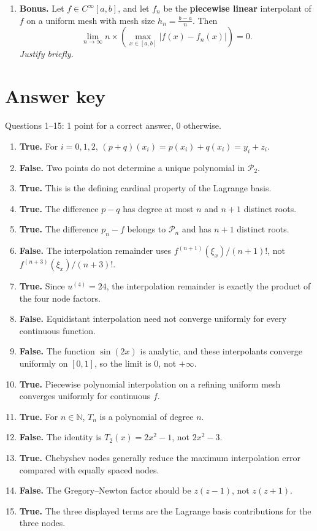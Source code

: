 \documentclass[a4paper]{article}
\begin{document}
\begin{enumerate}
    \item \textbf{Bonus.}
        Let $f\in C^{\infty}[a,b]$, and let $f_n$ be the \textbf{piecewise linear} interpolant of $f$ on a
        uniform mesh with mesh size $h_n= \frac{b-a}{n}$. 
        Then
        \[
            \lim_{n \to \infty} n \times \left( \max_{x\in[a,b]}\bigl\lvert f(x)-f_n(x)\bigr\rvert \right)=0.
        \]
        \emph{Justify briefly.}

\end{enumerate}

\ifdefined\showsolutions
\newpage
{}
\section*{Answer key}
\noindent Questions 1--15: 1 point for a correct answer, 0 otherwise.

\begin{enumerate}[itemsep=8pt]
    \item \textbf{True.} For $i=0,1,2$, $(p+q)(x_i)=p(x_i)+q(x_i)=y_i+z_i$.
    \item \textbf{False.} Two points do not determine a unique polynomial in $\mathcal P_2$.
    \item \textbf{True.} This is the defining cardinal property of the Lagrange basis.
    \item \textbf{True.} The difference $p-q$ has degree at most $n$ and $n+1$ distinct roots.
    \item \textbf{True.} The difference $p_n-f$ belongs to $\mathcal P_n$ and has $n+1$ distinct roots.
    \item \textbf{False.} The interpolation remainder uses $f^{(n+1)}(\xi_x)/(n+1)!$, not
    $f^{(n+3)}(\xi_x)/(n+3)!$.
    \item \textbf{True.} Since $u^{(4)}=24$, the interpolation remainder is exactly the product of the four node factors.
    \item \textbf{False.} Equidistant interpolation need not converge uniformly for every continuous function.
    \item \textbf{False.} The function $\sin(2x)$ is analytic, and these interpolants converge uniformly on $[0,1]$, so the limit is $0$, not $+\infty$.
    \item \textbf{True.} Piecewise polynomial interpolation on a refining uniform mesh converges uniformly for continuous $f$.
    \item \textbf{True.} For $n\in\mathbb N$, $T_n$ is a polynomial of degree $n$.
    \item \textbf{False.} The identity is $T_2(x)=2x^2-1$, not $2x^2-3$.
    \item \textbf{True.} Chebyshev nodes generally reduce the maximum interpolation error compared with equally spaced nodes.
    \item \textbf{False.} The Gregory--Newton factor should be $z(z-1)$, not $z(z+1)$.
    \item \textbf{True.} The three displayed terms are the Lagrange basis contributions for the three nodes.
\end{enumerate}
\end{document}
